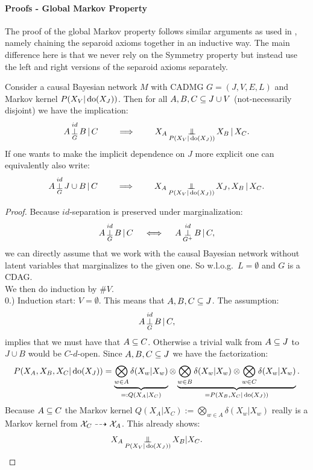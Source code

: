 \paragraph{Proofs - Global Markov Property }\hfill

The proof of the global Markov property follows similar arguments as used in \cite{Lau90, Ver93, Ric03, FM17, FM18, RERS17}, 
namely chaining the separoid axioms together in an inductive way.
The main difference here is that we never rely on the Symmetry property but instead use 
the left and right versions of the separoid axioms separately.


\begin{Thm}
\label{GMP-CCBN}
Consider a causal Bayesian network $M$ with \observational CADMG $G=(J,V,E,L)$ 
and \observational Markov kernel $P(X_V|\operatorname{do}(X_J))$.
Then for all $A, B, C \subseteq J \cup V$ (not-necessarily disjoint) we have the implication:
\[ A \operatorname*{\perp}^{id}_G B \operatorname*{|} C \qquad \implies \qquad X_A \operatorname*{\perp\mkern-11mu\perp}_{P(X_V|\operatorname{do}(X_J))} X_B \operatorname*{|} X_C.   \]
If one wants to make the implicit dependence on $J$ more explicit one can equivalently also write:
\[ A \operatorname*{\perp}^{id}_G J \cup B \operatorname*{|} C \qquad \implies \qquad X_A \operatorname*{\perp\mkern-11mu\perp}_{P(X_V|\operatorname{do}(X_J))} X_J,X_{B} \operatorname*{|} X_C.   \]
\begin{proof}
Because $id$-separation is preserved under marginalization:
\[ A \operatorname*{\perp}^{id}_G B \operatorname*{|} C \quad \iff \quad A \operatorname*{\perp}^{id}_{G^+} B \operatorname*{|} C,   \]
we can directly assume that we work with the causal Bayesian network without latent variables that marginalizes to the given one.
So w.l.o.g.\ $L=\emptyset$ and $G$ is a CDAG.\\
We then do induction by $\#V$. \\


0.) Induction start:  $V= \emptyset$. This means that $A,B,C \subseteq J$.
The assumption: 
\[A \operatorname*{\perp}^{id}_G  B \operatorname*{|} C,\] 
implies that we must have that $A \subseteq C$. Otherwise a trivial walk from $A \subseteq J$ to $J \cup B$ would be $C$-$d$-open.
Since $A,B,C \subseteq J$ we have the factorization:
\[ P(X_A,X_B,X_C|\operatorname{do}(X_J)) = \underbrace{\bigotimes_{w \in A} \delta(X_w|X_w)}_{=:Q(X_A|X_C)} \otimes 
 \underbrace{\bigotimes_{w \in B} \delta(X_w|X_w) \otimes \bigotimes_{w \in C} \delta(X_w|X_w)}_{=P(X_B,X_C|\operatorname{do}(X_J))}.  \]
 Because $A \subseteq C$ the Markov kernel $Q(X_A|X_C):= \bigotimes_{w \in A} \delta(X_w|X_w) $ 
 really is a Markov kernel from $\mathcal{X}_C \dashrightarrow \mathcal{X}_A$.
This already shows:
\[ X_A \operatorname*{\perp\mkern-11mu\perp}_{P(X_V|\operatorname{do}(X_J))} X_B |X_C.\]


\end{proof}
\end{Thm}
